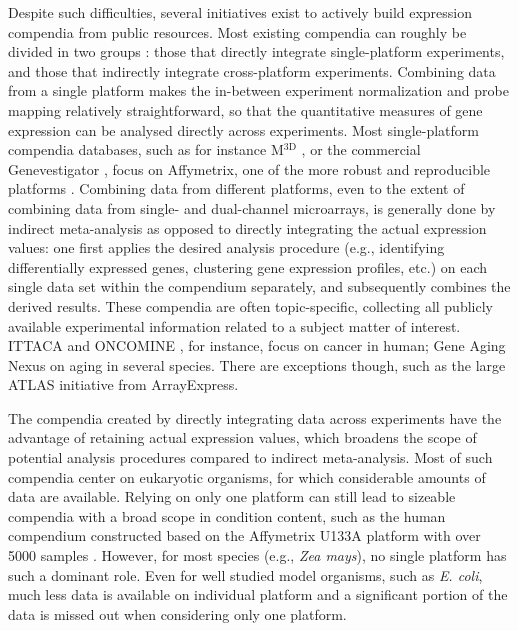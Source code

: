 Despite such difficulties, several initiatives exist to actively build
expression compendia from public resources.
%
Most existing compendia can roughly be divided in two groups \cite{Fierro2008}:
those that directly integrate single-platform experiments, and those that
indirectly integrate cross-platform experiments.
%
Combining data from a single platform makes the in-between experiment
normalization and probe mapping relatively straightforward, so that the
quantitative measures of gene expression can be analysed directly across
experiments.
%
Most single-platform compendia databases, such as for instance
M$^{\textrm{3D}}$ \cite{Faith2008}, or the commercial Genevestigator
\cite{Hruz2008}, focus on Affymetrix, one of the more robust and reproducible
platforms \cite{Bammler2005, Irizarry2005}.
%
Combining data from different platforms, even to the extent of combining data
from single- and dual-channel microarrays, is generally done by indirect
meta-analysis as opposed to directly integrating the actual expression values:
one first applies the desired analysis procedure (e.g., identifying
differentially expressed genes, clustering gene expression profiles, etc.) on
each single data set within the compendium separately, and subsequently
combines the derived results.
%
These compendia are often topic-specific, collecting all publicly available
experimental information related to a subject matter of interest.  ITTACA
\cite{Elfilali2006} and ONCOMINE \cite{Rhodes2007}, for instance, focus on
cancer in human; Gene Aging Nexus \cite{Pan2007} on aging in several species.
%
There are exceptions though, such as the large ATLAS \cite{Kapushesky2010}
initiative from ArrayExpress.


The compendia created by directly integrating data across experiments have the
advantage of retaining actual expression values, which broadens the scope of
potential analysis procedures compared to indirect meta-analysis.
%
Most of such compendia center on eukaryotic organisms, for which considerable
amounts of data are available.
%
Relying on only one platform can still lead to sizeable compendia with a broad
scope in condition content, such as the human compendium constructed based on
the Affymetrix U133A platform with over 5000 samples \cite{Lukk2010}.  However,
for most species (e.g., \textit{Zea mays}), no single platform has such a
dominant role.
%
%
Even for well studied model organisms, such as {\it E. coli}, much
less data is available on individual platform and a significant
portion of the data is missed out when considering only one platform.


